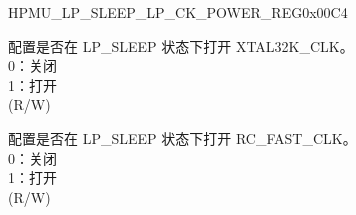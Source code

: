 \begin{register}{H}{PMU\_LP\_SLEEP\_LP\_CK\_POWER\_REG}{0x00C4}\label{regdesc:PMULPSLEEPLPCKPOWERREG}
%
%
%
%
%
\regnewline%
\begin{regdesc}\begin{reglist}
\label{fielddesc:PMULPSLEEPXPDXTAL32K}\item [PMU\_LP\_SLEEP\_XPD\_XTAL32K] 配置是否在 LP\_SLEEP 状态下打开 XTAL32K\_CLK。\\
0：关闭\\
1：打开\\
(R/W)
\label{fielddesc:PMULPSLEEPXPDFOSCCLK}\item [PMU\_LP\_SLEEP\_XPD\_FOSC\_CLK] 配置是否在 LP\_SLEEP 状态下打开 RC\_FAST\_CLK。\\
0：关闭\\
1：打开\\
(R/W)
\end{reglist}\end{regdesc}
\end{register}


